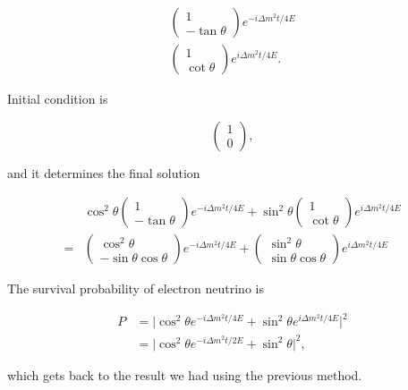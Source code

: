 \documentclass{tufte-handout}
\begin{document}
\begin{align*}
\begin{pmatrix}
1 \\ -\tan\theta
\end{pmatrix} e^{-i \Delta m^2 t/ 4E } \\
\begin{pmatrix}
1 \\ \cot \theta
\end{pmatrix} e^{i  \Delta m^2 t/ 4E }.
\end{align*}

Initial condition is 

\begin{equation*}
\begin{pmatrix}
1 \\ 0
\end{pmatrix},
\end{equation*}

and it determines the final solution

\begin{align*}
& \cos^2\theta \begin{pmatrix}
1 \\ -\tan\theta
\end{pmatrix} e^{-i \Delta m^2 t/ 4E } + \sin^2\theta
\begin{pmatrix}
1 \\ \cot \theta
\end{pmatrix} e^{i  \Delta m^2 t/ 4E } \\
= & \begin{pmatrix}
\cos^2\theta \\ -\sin\theta \cos\theta
\end{pmatrix} e^{-i \Delta m^2 t/ 4E } +
\begin{pmatrix}
 \sin^2\theta \\ \sin\theta \cos \theta
\end{pmatrix} e^{i  \Delta m^2 t/ 4E } 
\end{align*}


The survival probability of electron neutrino is

\begin{align*}
P &= \lvert \cos^2\theta e^{-i \Delta m^2 t/4E} + \sin^2\theta e^{i\Delta m^2 t/4E} \rvert^2 \\
& = \lvert \cos^2 \theta e^{-i \Delta m^2 t/2E} + \sin^2 \theta \rvert ^2 ,
\end{align*}

which gets back to the result we had using the previous method.
\end{document}
